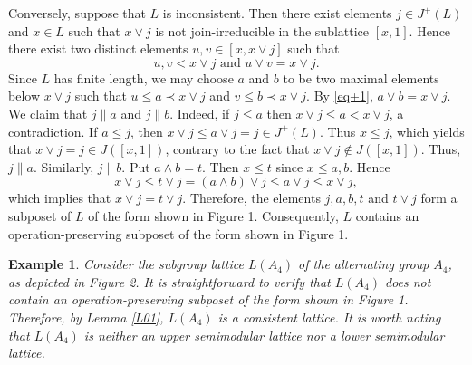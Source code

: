 \documentclass[12pt]{article}
\newtheorem{example}{\bf Example}[section]
\def\QEDopen{{\setlength{\fboxsep}{0pt}\setlength{\fboxrule}{0.2pt}\fbox{\rule[0pt]{0pt}{1.3ex}\rule[0pt]{1.3ex}{0pt}}}}
\def\QED{\QEDopen}
\def\endproof{\hspace*{\fill}~\QED\par\endtrivlist\unskip}
\begin{document}
Conversely, suppose that $L$ is inconsistent. Then there exist elements $j\in J^{+}(L)$ and $x\in L$ such 
that $x\vee j$ is not join-irreducible in the sublattice $[x,1]$. Hence there exist two distinct elements $u, v\in [x, x\vee j]$ such that 
\begin{equation}\label{eq+1}
 u, v<x\vee j\mbox{ and }u\vee v=x\vee j.   
\end{equation}
Since $L$ has finite length, we may choose $a$ and $b$ to be two maximal elements below $x\vee j$ 
such that $u\leq a\prec x\vee j$ and $v\leq b\prec x\vee j$.  By \eqref{eq+1}, $a\vee b=x\vee j$. 
We claim that $j\parallel a$ and $j\parallel b$. Indeed, if $j\leq a$ then $x\vee j\leq a<x\vee j$, a contradiction. 
If $a\leq j$, then $x\vee j\leq a\vee j=j\in J^{+}(L)$. Thus $x\leq j$, which yields that $x\vee j=j\in J([x,1])$, 
contrary to the fact that $x\vee j\notin J([x,1])$. Thus, $j\parallel a$. Similarly, $j\parallel b$. Put $a\wedge b=t$. 
Then $x\leq t$ since $x\leq a, b$. Hence
$$x\vee j\leq t\vee j=(a\wedge b)\vee j\leq a\vee j\leq x\vee j,$$
which implies that $x\vee j=t\vee j$. Therefore, the elements $j, a, b, t$ and $t\vee j$ form a subposet of $L$ of 
the form shown in Figure 1. Consequently, $L$ contains an operation-preserving subposet of the form shown in Figure 1. 
\endproof

\begin{example}\label{E01}
\emph{Consider the subgroup lattice $L(A_4)$ of the alternating group $A_4$, as depicted in Figure 2. It is straightforward to verify that $L(A_4)$ does not contain an operation-preserving subposet of the form shown in Figure 1. Therefore, by Lemma \ref{L01}, $L(A_4)$ is a consistent lattice. It is worth noting that $L(A_4)$ is neither an upper semimodular lattice nor a lower semimodular lattice.} 
\end{example}
\end{document}

